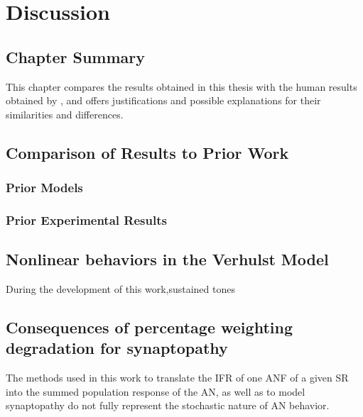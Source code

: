 \chapter{Discussion}
\label{chapter:Discussion}
\thispagestyle{myheadings}

\graphicspath{{6_Discussion/Figures/}}
\section{Chapter Summary} %
\label{sec:discussion_summary}
This chapter compares the results obtained in this thesis with the human results obtained by \citeauthor{Mehraei2016Auditory}, and offers justifications and possible explanations for their similarities and differences.

\section{Comparison of Results to Prior Work} %
\label{sec:comparison_of_results_to_prior_work}
\subsection{Prior Models} %
\label{sub:prior_models}

\subsection{Prior Experimental Results} %
\label{sub:prior_experimental_results}


\section{Nonlinear behaviors in the Verhulst Model} %
\label{sec:nonlinear_behaviors_in_the_verhulst_model}
During the development of this work,sustained tones 

\section{Consequences of percentage weighting degradation for synaptopathy} %
\label{sec:consequences_of_percentage_weighting_degradation_for_synaptopathy}
The methods used in this work to translate the IFR of one ANF of a given SR into the summed population response of the AN, as well as to model synaptopathy do not fully represent the stochastic nature of AN behavior. 
